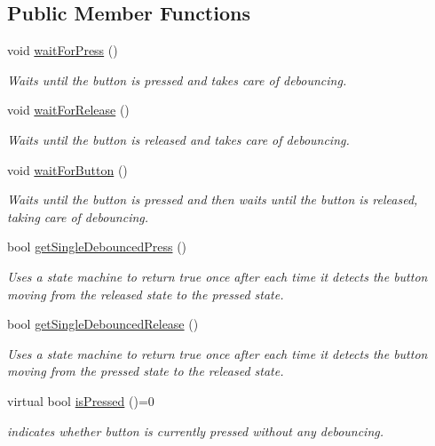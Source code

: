 \subsection*{Public Member Functions}
\begin{DoxyCompactItemize}
\item 
void \hyperlink{class_pushbutton_base_a2e2787595c82ee0913ecf4c1eea4a2c8}{wait\+For\+Press} ()
\begin{DoxyCompactList}\small\item\em Waits until the button is pressed and takes care of debouncing. \end{DoxyCompactList}\item 
void \hyperlink{class_pushbutton_base_ae5fff34b3e1ebd62fd02b99edd6bf13a}{wait\+For\+Release} ()
\begin{DoxyCompactList}\small\item\em Waits until the button is released and takes care of debouncing. \end{DoxyCompactList}\item 
void \hyperlink{class_pushbutton_base_ab755065c930be0649597220316213e8a}{wait\+For\+Button} ()
\begin{DoxyCompactList}\small\item\em Waits until the button is pressed and then waits until the button is released, taking care of debouncing. \end{DoxyCompactList}\item 
bool \hyperlink{class_pushbutton_base_a93953875c8b1c5f69dec3984774de296}{get\+Single\+Debounced\+Press} ()
\begin{DoxyCompactList}\small\item\em Uses a state machine to return true once after each time it detects the button moving from the released state to the pressed state. \end{DoxyCompactList}\item 
bool \hyperlink{class_pushbutton_base_ae568f5db0e8804247e0dcab72a311d42}{get\+Single\+Debounced\+Release} ()
\begin{DoxyCompactList}\small\item\em Uses a state machine to return true once after each time it detects the button moving from the pressed state to the released state. \end{DoxyCompactList}\item 
virtual bool \hyperlink{class_pushbutton_base_a5b11851f15413140b75e4574e773b6ae}{is\+Pressed} ()=0
\begin{DoxyCompactList}\small\item\em indicates whether button is currently pressed without any debouncing. \end{DoxyCompactList}\end{DoxyCompactItemize}



